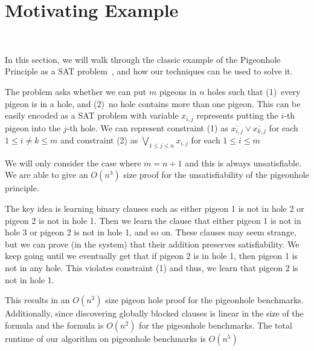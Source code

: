 \section{Motivating Example}~\label{sec:motivatex}


In this section, we will walk through the classic example of the Pigeonhole Principle as a SAT problem~\cite{}, and how our techniques can be used to solve it.

The problem asks whether we can put $m$ pigeons in $n$ holes such that (1)~every pigeon is in a hole, and (2)~no hole contains more than one pigeon. This can be easily encoded as a SAT problem with variable $x_{i, j}$ represents putting the $i$-th pigeon into the $j$-th hole. We can represent constraint (1) as $\overline{x_{i, j}} \lor \overline{x_{k, j}}$ for each $ 1 \leq i \neq k \leq m$ and constraint (2) as $\bigvee_{1 \leq j \leq n} x_{i, j}$ for each $1 \leq i \leq m$

We will only consider the case where $m = n + 1$ and this is always unsatisfiable. We are able to give an $O(n^3)$ size proof for the unsatisfiability of the pigeonhole principle.

The key idea is learning binary clauses such as either pigeon 1 is not in hole 2 or pigeon 2 is not in hole 1. Then we learn the clause that either pigeon 1 is not in hole 3 or pigeon 2 is not in hole 1, and so on. These clauses may seem strange, but we can prove (in the \pr system) that their addition preserves satisfiability. We keep going until we eventually get that if pigeon 2 is in hole 1, then pigeon 1 is not in any hole. This violates constraint (1) and thus, we learn that pigeon 2 is not in hole 1. 


This results in an $O(n^3)$ size pigeon hole proof for the pigeonhole benchmarks. Additionally, since discovering globally blocked clauses is linear in the size of the formula and the formula is $O(n^2)$ for the pigeonhole benchmarks. The total runtime of our algorithm on pigeonhole benchmarks is $O(n^5)$


